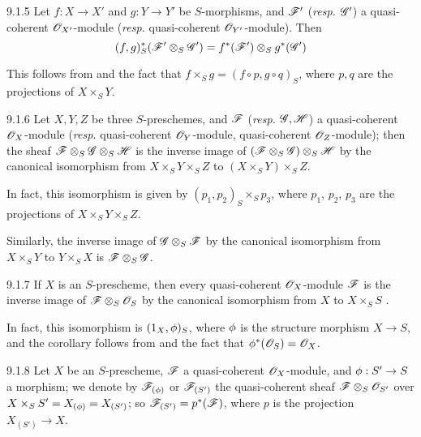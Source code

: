\begin{envs}[Corollary]{9.1.5}
\label{cor-1.9.1.5}
Let $f:X\to X'$ and $g:Y\to Y'$ be
$S$-morphisms, and $\mathscr{F}'$ (\emph{resp.} $\mathscr{G}'$) a quasi-coherent
$\mathscr{O}_{X'}$-module (\emph{resp.} quasi-coherent $\mathscr{O}_{Y'}$-module). Then
\[
  (f,g)^*_S(\mathscr{F}'\otimes_S\mathscr{G}')=f^*(\mathscr{F}')\otimes_S g^*(\mathscr{G}')
\]
\end{envs}

This follows from  and the fact that $f\times_S g=(f\circ p, g\circ q)_S$,
where $p,q$ are the projections of $X\times_S Y$.

\begin{envs}[Corollary]{9.1.6}
\label{cor-1.9.1.6}
Let $X,Y,Z$ be three $S$-preschemes, and $\mathscr{F}$ (\emph{resp.} $\mathscr{G},\mathscr{H}$) a
quasi-coherent $\mathscr{O}_X$-module (\emph{resp.} quasi-coherent $\mathscr{O}_Y$-module, quasi-coherent
$\mathscr{O}_Z$-module); then the sheaf $\mathscr{F}\otimes_S\mathscr{G}\otimes_S\mathscr{H}$ is the inverse image
of $(\mathscr{F}\otimes_S\mathscr{G})\otimes_S\mathscr{H}$ by the canonical isomorphism from
$X\times_S Y\times_S Z$ to $(X\times_S Y)\times_S Z$.
\end{envs}

In fact, this isomorphism is given by $(p_1,p_2)_S\times_S p_3$, where $p_1$, $p_2$, $p_3$
are the projections of $X\times_S Y\times_S Z$.

Similarly, the inverse image of $\mathscr{G}\otimes_S\mathscr{F}$ by the canonical isomorphism from
$X\times_S Y$ to $Y\times_S X$ is $\mathscr{F}\otimes_S\mathscr{G}$.

\begin{envs}[Corollary]{9.1.7}
\label{cor-1.9.1.7}
If $X$ is an $S$-prescheme, then every quasi-coherent $\mathscr{O}_X$-module $\mathscr{F}$ is the inverse
image of $\mathscr{F}\otimes_S\mathscr{O}_S$ by the canonical isomorphism from $X$ to $X\times_S S$
.
\end{envs}

In fact, this isomorphism is $(1_X,\phi)_S$, where $\phi$ is the structure morphism
$X\to S$, and the corollary follows from  and the fact that
$\phi^*(\mathscr{O}_S)=\mathscr{O}_X$.

\begin{env}{9.1.8}
\label{env-1.9.1.8}
Let $X$ be an $S$-prescheme, $\mathscr{F}$ a quasi-coherent
$\mathscr{O}_X$-module, and $\phi:S'\to S$ a morphism; we denote by
$\mathscr{F}_{(\phi)}$ or $\mathscr{F}_{(S')}$ the quasi-coherent sheaf
$\mathscr{F}\otimes_S\mathscr{O}_{S'}$ over $X\times_S S'=X_{(\phi)}=X_{(S')}$; so
$\mathscr{F}_{(S')}=p^*(\mathscr{F})$, where $p$ is the projection $X_{(S')}\to X$.
\end{env}


